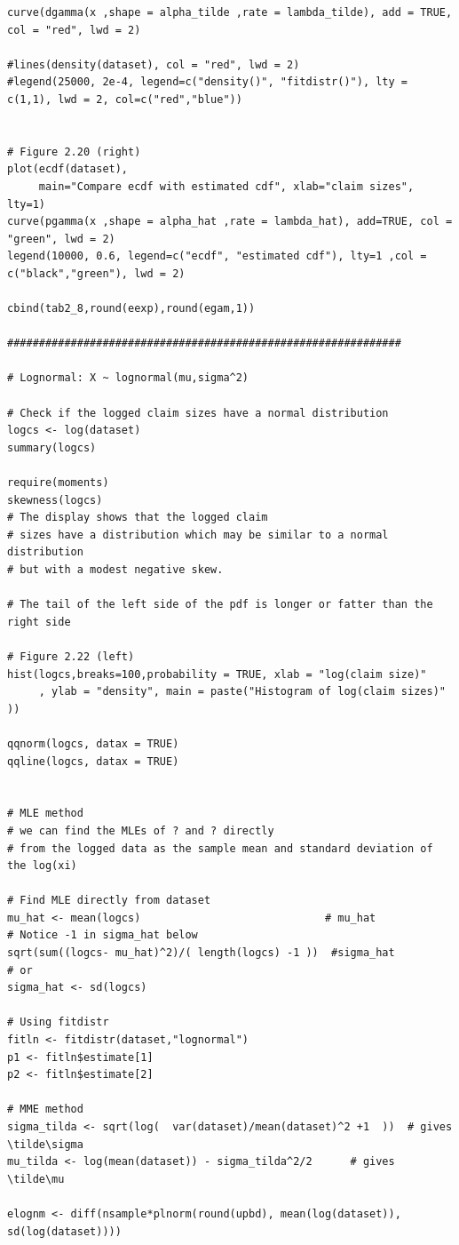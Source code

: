 \documentclass[
]{book}
\theoremstyle{definition}
\theoremstyle{definition}
\theoremstyle{definition}
\theoremstyle{definition}
\theoremstyle{remark}
\begin{document}
\begin{verbatim}
curve(dgamma(x ,shape = alpha_tilde ,rate = lambda_tilde), add = TRUE, col = "red", lwd = 2)

#lines(density(dataset), col = "red", lwd = 2)
#legend(25000, 2e-4, legend=c("density()", "fitdistr()"), lty = c(1,1), lwd = 2, col=c("red","blue"))


# Figure 2.20 (right)
plot(ecdf(dataset),
     main="Compare ecdf with estimated cdf", xlab="claim sizes", lty=1)
curve(pgamma(x ,shape = alpha_hat ,rate = lambda_hat), add=TRUE, col = "green", lwd = 2)
legend(10000, 0.6, legend=c("ecdf", "estimated cdf"), lty=1 ,col = c("black","green"), lwd = 2)

cbind(tab2_8,round(eexp),round(egam,1))

##############################################################

# Lognormal: X ~ lognormal(mu,sigma^2)

# Check if the logged claim sizes have a normal distribution
logcs <- log(dataset)
summary(logcs)

require(moments)
skewness(logcs)
# The display shows that the logged claim
# sizes have a distribution which may be similar to a normal distribution 
# but with a modest negative skew.

# The tail of the left side of the pdf is longer or fatter than the right side

# Figure 2.22 (left)
hist(logcs,breaks=100,probability = TRUE, xlab = "log(claim size)" 
     , ylab = "density", main = paste("Histogram of log(claim sizes)" ))

qqnorm(logcs, datax = TRUE)
qqline(logcs, datax = TRUE)


# MLE method
# we can find the MLEs of ? and ? directly
# from the logged data as the sample mean and standard deviation of the log(xi)

# Find MLE directly from dataset
mu_hat <- mean(logcs)                             # mu_hat
# Notice -1 in sigma_hat below
sqrt(sum((logcs- mu_hat)^2)/( length(logcs) -1 ))  #sigma_hat
# or
sigma_hat <- sd(logcs)

# Using fitdistr
fitln <- fitdistr(dataset,"lognormal")
p1 <- fitln$estimate[1]
p2 <- fitln$estimate[2]

# MME method
sigma_tilda <- sqrt(log(  var(dataset)/mean(dataset)^2 +1  ))  # gives \tilde\sigma
mu_tilda <- log(mean(dataset)) - sigma_tilda^2/2      # gives \tilde\mu

elognm <- diff(nsample*plnorm(round(upbd), mean(log(dataset)), sd(log(dataset))))


\end{verbatim}
\end{document}
